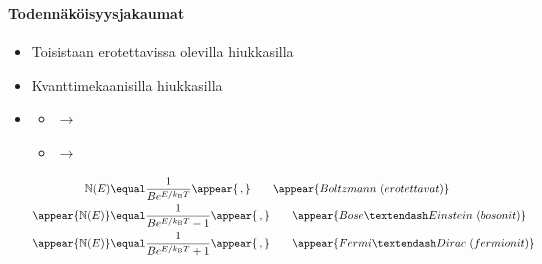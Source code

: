 \begin{frame}
\frametitle{\texorpdfstring{\culine[\sectiontitleulinecolor]{\sectiontitle}}{\sectiontitle} }
\framesubtitle{Todennäköisyysjakaumat}
\appear{}
\begin{itemize}
	\item Toisistaan erotettavissa olevilla hiukkasilla

\item Kvanttimekaanisilla hiukkasilla 
\item[] \begin{itemize}[itemsep=2.5mm]
	\item {} $\rightarrow$ 
	\item {} $\rightarrow$ 
\end{itemize}

\[
\begin{aligned}
\mathbb{N}(E) & \equal  \frac{1}{B e^{E / k_{\mathrm{B}} T}} \appear{\,,} \qquad \appear{Boltzmann~(erotettavat)} \\
\appear{\mathbb{N}(E)} & \equal  \frac{1}{B e^{E / k_{\mathrm{B}} T}-1} \appear{\,,} \qquad \appear{Bose–Einstein~(bosonit)} \\
\appear{\mathbb{N}(E)} & \equal  \frac{1}{B e^{E / k_{\mathrm{B}} T}+1} \appear{\,,} \qquad \appear{Fermi–Dirac~(fermionit)}
\end{aligned}
\]

\end{itemize}

\endofslide 
\end{frame}

